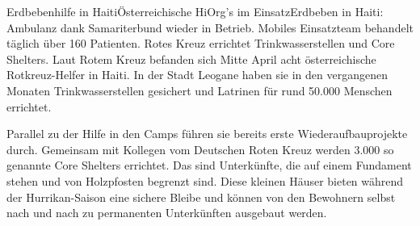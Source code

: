 \begin{NewsItem}{}{Erdbebenhilfe in Haiti}{Österreichische HiOrg's im
Einsatz}{Erdbeben in Haiti: Ambulanz dank Samariterbund wieder in Betrieb.
Mobiles Einsatzteam behandelt täglich über 160 Patienten. Rotes Kreuz errichtet
Trinkwasserstellen und Core Shelters.} {}
Laut Rotem Kreuz befanden sich Mitte April acht österreichische Rotkreuz-Helfer
in Haiti. In der Stadt Leogane haben sie in den vergangenen Monaten
Trinkwasserstellen gesichert und Latrinen für rund 50.000 Menschen errichtet.

Parallel zu der Hilfe in den Camps führen sie bereits erste Wiederaufbauprojekte
durch. Gemeinsam mit Kollegen vom Deutschen Roten Kreuz werden 3.000 so genannte
Core Shelters errichtet. Das sind Unterkünfte, die auf einem Fundament stehen und
von Holzpfosten begrenzt sind. Diese kleinen Häuser bieten während der
Hurrikan-Saison eine sichere Bleibe und können von den Bewohnern selbst nach und
nach zu permanenten Unterkünften ausgebaut werden.
\end{NewsItem}


